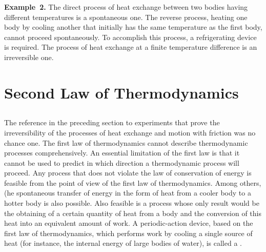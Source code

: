 \textbf{Example~2.} The direct process of heat exchange  between two bodies having different temperatures is a spontaneous one. The reverse process, heating one body by cooling another that initially has the same temperature as the first body, cannot proceed spontaneously. To accomplish this process, a refrigerat­ing device  is required. The process of heat exchange at a finite temperature difference is an irreversible one.


\section{Second Law of Thermodynamics}
\label{sec-11.3}

\subsection{}\label{11.3.1} The reference in the preceding section to experiments that prove the irreversibility of the processes of heat exchange and motion with friction  was no chance one. The first law of thermodynamics  cannot describe thermodynamic processes comprehensively. An essential limitation of the first law is that it cannot be used to predict in which direction a thermodynamic process will proceed. Any process that does not violate the law of conservation of energy is feasible from the point of view of the first law of thermodynamics. Among others, (he spontaneous transfer of energy in the form of heat from a cooler body to a hotter body is also possible. Also feasible is a process whose only result would be the obtaining of a certain quantity of heat from a body and the conversion of this heat into an equivalent amount of work. A periodic-action device, based on the first law of thermodynamics, which performs work by cooling a single source of heat (for instance, the internal energy of large bodies of water), is called a .

